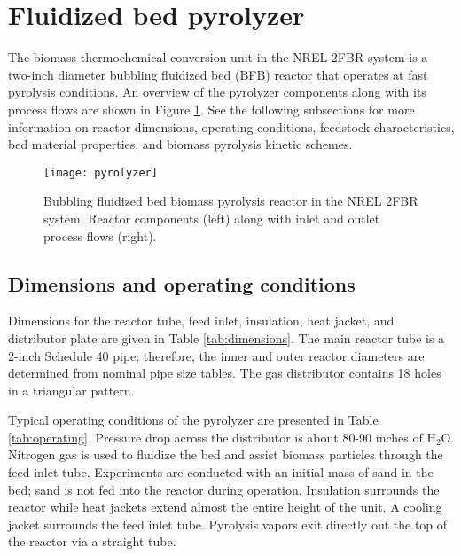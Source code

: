 
\section{Fluidized bed pyrolyzer}

The biomass thermochemical conversion unit in the NREL 2FBR system is a two-inch diameter bubbling fluidized bed (BFB) reactor that operates at fast pyrolysis conditions. An overview of the pyrolyzer components along with its process flows are shown in Figure \ref{fig:pyrolyzer}. See the following subsections for more information on reactor dimensions, operating conditions, feedstock characteristics, bed material properties, and biomass pyrolysis kinetic schemes.

\begin{figure}[H]
    \centering
    \texttt{[image: pyrolyzer]}
    \caption{Bubbling fluidized bed biomass pyrolysis reactor in the NREL 2FBR system. Reactor components (left) along with inlet and outlet process flows (right).}
    \label{fig:pyrolyzer}
\end{figure}

\subsection{Dimensions and operating conditions}

Dimensions for the reactor tube, feed inlet, insulation, heat jacket, and distributor plate are given in Table \ref{tab:dimensions}. The main reactor tube is a 2-inch Schedule 40 pipe; therefore, the inner and outer reactor diameters are determined from nominal pipe size tables. The gas distributor contains 18 holes in a triangular pattern.

Typical operating conditions of the pyrolyzer are presented in Table \ref{tab:operating}. Pressure drop across the distributor is about 80-90 inches of H$_2$O. Nitrogen gas is used to fluidize the bed and assist biomass particles through the feed inlet tube. Experiments are conducted with an initial mass of sand in the bed; sand is not fed into the reactor during operation. Insulation surrounds the reactor while heat jackets extend almost the entire height of the unit. A cooling jacket surrounds the feed inlet tube. Pyrolysis vapors exit directly out the top of the reactor via a straight tube.

